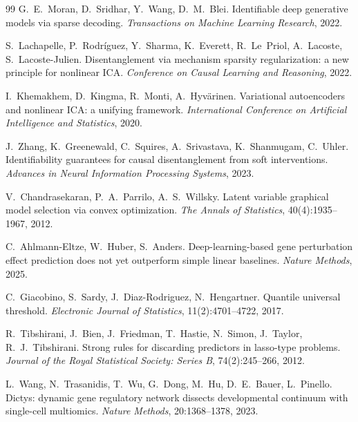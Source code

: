 \documentclass[a4paper, 11pt]{article}
\theoremstyle{plain}
\theoremstyle{remark}
\begin{document}
\begin{thebibliography}{99}
G.~E.~Moran, D.~Sridhar, Y.~Wang, D.~M.~Blei.
\newblock Identifiable deep generative models via sparse decoding.
\newblock \emph{Transactions on Machine Learning Research}, 2022.

S.~Lachapelle, P.~Rodríguez, Y.~Sharma, K.~Everett, R.~Le~Priol, A.~Lacoste, S.~Lacoste-Julien.
\newblock Disentanglement via mechanism sparsity regularization: a new principle for nonlinear ICA.
\newblock \emph{Conference on Causal Learning and Reasoning}, 2022.

I.~Khemakhem, D.~Kingma, R.~Monti, A.~Hyvärinen.
\newblock Variational autoencoders and nonlinear ICA: a unifying framework.
\newblock \emph{International Conference on Artificial Intelligence and Statistics}, 2020.

J.~Zhang, K.~Greenewald, C.~Squires, A.~Srivastava, K.~Shanmugam, C.~Uhler.
\newblock Identifiability guarantees for causal disentanglement from soft interventions.
\newblock \emph{Advances in Neural Information Processing Systems}, 2023.

V.~Chandrasekaran, P.~A.~Parrilo, A.~S.~Willsky.
\newblock Latent variable graphical model selection via convex optimization.
\newblock \emph{The Annals of Statistics}, 40(4):1935--1967, 2012.

C.~Ahlmann-Eltze, W.~Huber, S.~Anders.
\newblock Deep-learning-based gene perturbation effect prediction does not yet outperform simple linear baselines.
\newblock \emph{Nature Methods}, 2025.

C.~Giacobino, S.~Sardy, J.~Diaz-Rodriguez, N.~Hengartner.
\newblock Quantile universal threshold.
\newblock \emph{Electronic Journal of Statistics}, 11(2):4701--4722, 2017.

R.~Tibshirani, J.~Bien, J.~Friedman, T.~Hastie, N.~Simon, J.~Taylor, R.~J.~Tibshirani.
\newblock Strong rules for discarding predictors in lasso-type problems.
\newblock \emph{Journal of the Royal Statistical Society: Series B}, 74(2):245--266, 2012.

L.~Wang, N.~Trasanidis, T.~Wu, G.~Dong, M.~Hu, D.~E.~Bauer, L.~Pinello.
\newblock Dictys: dynamic gene regulatory network dissects developmental continuum with single-cell multiomics.
\newblock \emph{Nature Methods}, 20:1368--1378, 2023.


\end{thebibliography}
\end{document}
